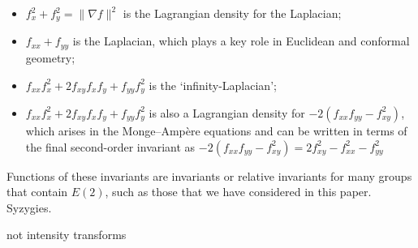 \documentclass[review,onefignum,onetabnum]{siamonline190516}
\begin{document}
\begin{itemize}
\item $f_x^2 + f_y^2=\|\nabla f\|^2$ is the Lagrangian density for the Laplacian;
\item $f_{xx} + f_{yy}$ is the Laplacian, which plays a key role in Euclidean and conformal geometry;
\item $f_{xx}f_x^2 + 2 f_{xy} f_x f_y + f_{yy} f_y^2 $ is the `infinity-Laplacian'; 
\item $f_{xx}f_x^2 + 2 f_{xy} f_x f_y + f_{yy} f_y^2 $ is also a Lagrangian density for $-2(f_{xx} f_{yy} - f_{xy}^2)$, which arises in the Monge--Amp\`ere equations and can be written in terms of the final second-order invariant as $-2 (f_{xx} f_{yy} - f_{xy}^2) = 2 f_{xy}^2 - f_{xx}^2 - f_{yy}^2$
\end{itemize}

Functions of these invariants are invariants or relative invariants for many groups that contain $E(2)$, such as those that we have considered in this paper. Syzygies.

not intensity transforms



\end{document}
